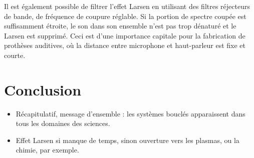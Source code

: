 \documentclass[11pt,a4paper]{report}
\begin{document}
Il est également possible de filtrer l'effet Larsen en utilisant des filtres réjecteurs de bande, de fréquence de coupure réglable. Si la portion de spectre coupée est suffisamment étroite, le son dans son ensemble n'est pas trop dénaturé et le Larsen est supprimé. Ceci est d'une importance capitale pour la fabrication de prothèses auditives, où la distance entre microphone et haut-parleur est fixe et courte.

\section*{Conclusion}

\begin{itemize}
	\item Récapitulatif, message d'ensemble : les systèmes bouclés apparaissent dans tous les domaines des sciences.
	\item Effet Larsen si manque de temps, sinon ouverture vers les plasmas, ou la chimie, par exemple.
\end{itemize}
\end{document}
